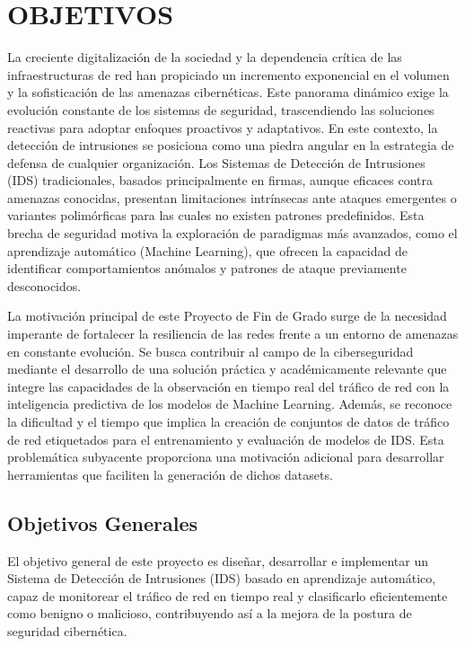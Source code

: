\chapter{OBJETIVOS}

La creciente digitalización de la sociedad y la dependencia crítica de las infraestructuras de red han propiciado un incremento exponencial en el volumen y la sofisticación de las amenazas cibernéticas. Este panorama dinámico exige la evolución constante de los sistemas de seguridad, trascendiendo las soluciones reactivas para adoptar enfoques proactivos y adaptativos. En este contexto, la detección de intrusiones se posiciona como una piedra angular en la estrategia de defensa de cualquier organización. Los Sistemas de Detección de Intrusiones (IDS) tradicionales, basados principalmente en firmas, aunque eficaces contra amenazas conocidas, presentan limitaciones intrínsecas ante ataques emergentes o variantes polimórficas para las cuales no existen patrones predefinidos. Esta brecha de seguridad motiva la exploración de paradigmas más avanzados, como el aprendizaje automático (Machine Learning), que ofrecen la capacidad de identificar comportamientos anómalos y patrones de ataque previamente desconocidos.

La motivación principal de este Proyecto de Fin de Grado surge de la necesidad imperante de fortalecer la resiliencia de las redes frente a un entorno de amenazas en constante evolución. Se busca contribuir al campo de la ciberseguridad mediante el desarrollo de una solución práctica y académicamente relevante que integre las capacidades de la observación en tiempo real del tráfico de red con la inteligencia predictiva de los modelos de Machine Learning. Además, se reconoce la dificultad y el tiempo que implica la creación de conjuntos de datos de tráfico de red etiquetados para el entrenamiento y evaluación de modelos de IDS. Esta problemática subyacente proporciona una motivación adicional para desarrollar herramientas que faciliten la generación de dichos datasets.

\section{Objetivos Generales}
El objetivo general de este proyecto es diseñar, desarrollar e implementar un Sistema de Detección de Intrusiones (IDS) basado en aprendizaje automático, capaz de monitorear el tráfico de red en tiempo real y clasificarlo eficientemente como benigno o malicioso, contribuyendo así a la mejora de la postura de seguridad cibernética.

